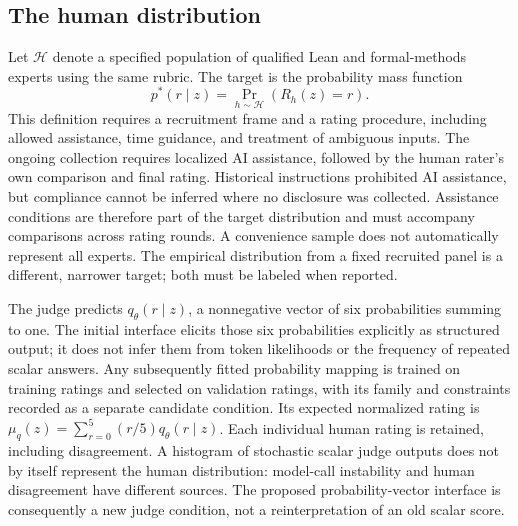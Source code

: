 \subsection{The human distribution}
Let $\mathcal H$ denote a specified population of qualified Lean and formal-methods experts using the same rubric.
The target is the probability mass function
\begin{equation}
 p^*(r\mid z)=\Pr_{h\sim\mathcal H}(R_h(z)=r).
\end{equation}
This definition requires a recruitment frame and a rating procedure, including allowed assistance, time guidance, and treatment of ambiguous inputs.
The ongoing collection requires localized AI assistance, followed by the human rater's own comparison and final rating.
Historical instructions prohibited AI assistance, but compliance cannot be inferred where no disclosure was collected.
Assistance conditions are therefore part of the target distribution and must accompany comparisons across rating rounds.
A convenience sample does not automatically represent all experts.
The empirical distribution from a fixed recruited panel is a different, narrower target; both must be labeled when reported.

The judge predicts $q_\theta(r\mid z)$, a nonnegative vector of six probabilities summing to one.
The initial interface elicits those six probabilities explicitly as structured output; it does not infer them from token likelihoods or the frequency of repeated scalar answers.
Any subsequently fitted probability mapping is trained on training ratings and selected on validation ratings, with its family and constraints recorded as a separate candidate condition.
Its expected normalized rating is $\mu_q(z)=\sum_{r=0}^5(r/5)q_\theta(r\mid z)$.
Each individual human rating is retained, including disagreement.
A histogram of stochastic scalar judge outputs does not by itself represent the human distribution: model-call instability and human disagreement have different sources.
The proposed probability-vector interface is consequently a new judge condition, not a reinterpretation of an old scalar score.
